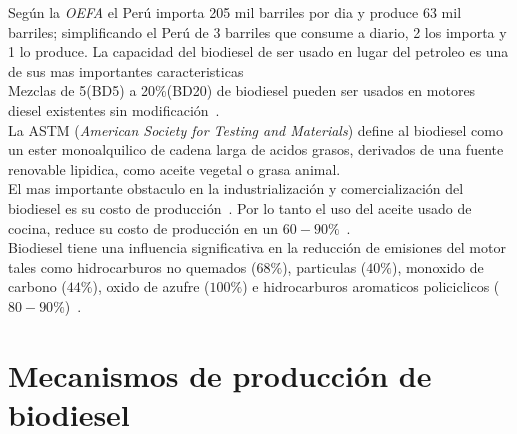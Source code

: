 \documentclass[a4paper,10pt]{article}
\begin{document}
Según la \emph{OEFA} el Perú importa 205 mil barriles por dia y produce 63 mil barriles; simplificando el Perú de 3 barriles que
consume a diario, 2 los importa y 1 lo produce.
La capacidad del biodiesel de ser usado en lugar del petroleo es una de sus mas importantes caracteristicas~\cite{geyer1984} \\
Mezclas de 5(BD5) a 20\%(BD20) de biodiesel pueden ser usados en motores diesel existentes sin modificación~\cite{Ghorbani2011}.\\
La ASTM (\emph{American Society for Testing and Materials}) define al biodiesel como un ester monoalquilico de cadena larga de acidos 
grasos, derivados de una fuente renovable lipidica, como aceite vegetal o grasa animal.\\
El mas importante obstaculo en la industrialización y comercialización del biodiesel es su costo de producción~\cite{talebian2013,demirbas2009}. 
Por lo tanto el uso del aceite usado de cocina, reduce su costo de producción en un $60-90\%$~\cite{talebian2013,canakci1998}. \\
Biodiesel tiene una influencia significativa en la reducción de emisiones del motor tales como hidrocarburos no 
quemados ($68\%$), particulas ($40\%$), monoxido de carbono ($44\%$), oxido de azufre ($100\%$) e 
hidrocarburos aromaticos policiclicos ($80-90\%$)~\cite{talebian2013,leduc2009}.

\section{Mecanismos de producción de biodiesel}
\end{document}
